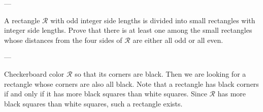 
---

A rectangle $\mathcal R$ with odd integer side lengths is divided into small rectangles with integer side lengths. Prove that there is at least one among the small rectangles whose distances from the four sides of $\mathcal R$ are either all odd or all even.

---

Checkerboard color $\mathcal R$ so that its corners are black. Then we are looking for a rectangle whose corners are also all black. Note that a rectangle has black corners if and only if it has more black squares than white squares. Since $\mathcal R$ has more black squares than white squares, such a rectangle exists.

